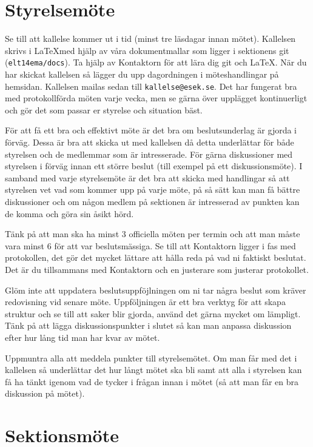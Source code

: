\documentclass[10pt]{article}
\begin{document}
    \section{Styrelsemöte}
    
    Se till att kallelse kommer ut i tid (minst tre läsdagar innan mötet).
    Kallelsen skrivs i \LaTeX med hjälp av våra dokumentmallar som ligger i sektionens git (\texttt{elt14ema/docs}). Ta hjälp av Kontaktorn för att lära dig git och \LaTeX. När du har skickat kallelsen så lägger du upp dagordningen i möteshandlingar på hemsidan. Kallelsen mailas sedan till \texttt{kallelse@esek.se}. Det har fungerat bra med protokollförda möten varje vecka, men se gärna över upplägget kontinuerligt och gör det som passar er styrelse och situation bäst.
    
    För att få ett bra och effektivt möte är det bra om beslutsunderlag är gjorda i förväg. Dessa är bra att skicka ut med kallelsen då detta underlättar för både styrelsen och de medlemmar som är intresserade. För gärna diskussioner med styrelsen i förväg innan ett större beslut (till exempel på ett diskussionsmöte). I samband med varje styrelsemöte är det bra att skicka med handlingar så att styrelsen vet vad som kommer upp på varje möte, på så sätt kan man få bättre diskussioner och om någon medlem på sektionen är intresserad av punkten kan de komma och göra sin åsikt hörd.
    
    Tänk på att man ska ha minst 3 officiella möten per termin och att man måste vara minst 6 för att var beslutsmässiga. Se till att Kontaktorn ligger i fas med protokollen, det gör det mycket lättare att hålla reda på vad ni faktiskt beslutat. Det är du tillsammans med Kontaktorn och en justerare som justerar protokollet.
    
    Glöm inte att uppdatera beslutsuppföjlningen om ni tar några beslut som kräver redovisning vid senare möte. Uppföljningen är ett bra verktyg för att skapa struktur och se till att saker blir gjorda, använd det gärna mycket om lämpligt. Tänk på att lägga diskussionspunkter i slutet så kan man anpassa diskussion efter hur lång tid man har kvar av mötet.
    
    Uppmuntra alla att meddela punkter till styrelsemötet. Om man får med det i kallelsen så underlättar det hur långt mötet ska bli samt att alla i styrelsen kan få ha tänkt igenom vad de tycker i frågan innan i mötet (så att man får en bra diskussion på mötet).
    
    \section{Sektionsmöte}
    
\end{document}
